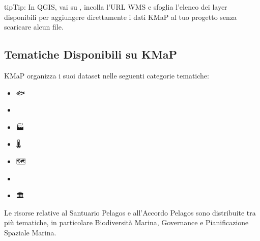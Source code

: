 \documentclass[letterpaper,10pt,english]{sphinxmanual}
\begin{document}
\begin{sphinxadmonition}{tip}{Tip:}
\sphinxAtStartPar
In QGIS, vai su , incolla l’URL
WMS e sfoglia l’elenco dei layer disponibili per aggiungere direttamente i dati KMaP
al tuo progetto senza scaricare alcun file.
\end{sphinxadmonition}


\subsection{Tematiche Disponibili su KMaP}
\label{\detokenize{it/01_benvenuto:tematiche-disponibili-su-kmap}}
\sphinxAtStartPar
KMaP organizza i suoi dataset nelle seguenti categorie tematiche:
\begin{itemize}
\item {} 
\sphinxAtStartPar
🐟  

\item {} 
\sphinxAtStartPar
🌊  

\item {} 
\sphinxAtStartPar
🏭  

\item {} 
\sphinxAtStartPar
🌡  

\item {} 
\sphinxAtStartPar
🗺  

\item {} 
\sphinxAtStartPar
💙  

\item {} 
\sphinxAtStartPar
🏛  

\end{itemize}

\sphinxAtStartPar
Le risorse relative al Santuario Pelagos e all’Accordo Pelagos sono distribuite tra
più tematiche, in particolare Biodiversità Marina, Governance e Pianificazione Spaziale
Marina.

\sphinxstepscope
\end{document}
